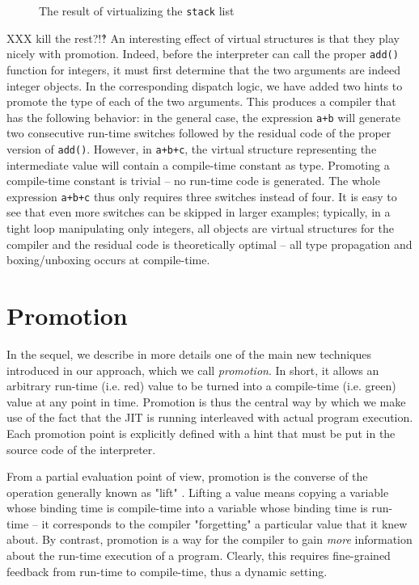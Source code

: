 \begin{figure}[h]
\begin{center}

\caption{The result of virtualizing the \lstinline{stack} list}
\label{fig:tlc-main}
\end{center}
\end{figure}

XXX kill the rest?!‽
An interesting effect of virtual structures is that they play nicely with
promotion.  Indeed, before the interpreter can call the proper \texttt{add()}
function for integers, it must first determine that the two arguments
are indeed integer objects.  In the corresponding dispatch logic, we
have added two hints to promote the type of each of the two arguments.
This produces a compiler that has the following behavior: in the general
case, the expression \texttt{a+b} will generate two consecutive run-time
switches followed by the residual code of the proper version of
\texttt{add()}.  However, in \texttt{a+b+c}, the virtual structure representing
the intermediate value will contain a compile-time constant as type.
Promoting a compile-time constant is trivial – no run-time code is
generated.  The whole expression \texttt{a+b+c} thus only requires three
switches instead of four.  It is easy to see that even more switches can
be skipped in larger examples; typically, in a tight loop manipulating
only integers, all objects are virtual structures for the compiler and
the residual code is theoretically optimal – all type propagation and
boxing/unboxing occurs at compile-time.


\section{Promotion}
\label{sec:promotion}

In the sequel, we describe in more details one of the main new
techniques introduced in our approach, which we call \emph{promotion}.  In
short, it allows an arbitrary run-time (i.e. red) value to be turned into a
compile-time (i.e. green) value at any point in time.  Promotion is thus the central way by
which we make use of the fact that the JIT is running interleaved with actual
program execution. Each promotion point is explicitly defined with a hint that
must be put in the source code of the interpreter.

From a partial evaluation point of view, promotion is the converse of
the operation generally known as "lift" \cite{XXX}.  Lifting a value means
copying a variable whose binding time is compile-time into a variable
whose binding time is run-time – it corresponds to the compiler
"forgetting" a particular value that it knew about.  By contrast,
promotion is a way for the compiler to gain \emph{more} information about
the run-time execution of a program. Clearly, this requires
fine-grained feedback from run-time to compile-time, thus a
dynamic setting.


